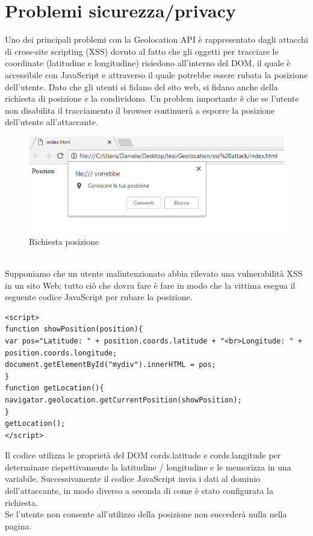 \documentclass[11pt ,a4paper , twoside , openright ]{article}
\begin{document}
\section{Problemi sicurezza/privacy}
Uno dei principali problemi con la Geolocation API è rappresentato dagli attacchi di cross-site scripting (XSS) dovuto al fatto che gli oggetti per tracciare le coordinate (latitudine e longitudine) risiedono all'interno del DOM, il quale è accessibile con JavaScript e attraverso il quale potrebbe essere rubata la posizione dell'utente. 
Dato che gli utenti si fidano del sito web, si fidano anche della richiesta di posizione e la condividono.
Un problem importante è che se l'utente non disabilita il tracciamento il browser continuerà a esporre la posizione dell'utente all'attaccante.
\begin{figure}[h]
	\centering
	\includegraphics[width=1\linewidth]{pos1}
	\caption{Richiesta posizione}
	\label{fig: Richiesta posizione}
\end{figure}
\\
Supponiamo che un utente malintenzionato abbia rilevato una vulnerabilità XSS in un sito Web; tutto ciò che dovra fare è fare in modo che la vittima esegua il seguente codice JavaScript per rubare la posizione.
\begin{lstlisting}
<script>
function showPosition(position){
var pos="Latitude: " + position.coords.latitude + "<br>Longitude: " + position.coords.longitude;
document.getElementById("mydiv").innerHTML = pos;
}
function getLocation(){
navigator.geolocation.getCurrentPosition(showPosition);
}
getLocation();
</script>
\end{lstlisting}
Il codice utilizza le proprietà del DOM cords.latitude e cords.langitude per determinare rispettivamente la latitudine / longitudine e le memorizza in una variabile. Successivamente il codice JavaScript invia i dati al dominio dell'attaccante, in modo diverso a seconda di come è stato configurata la richiesta.	
\\
Se l'utente non consente all'utilizzo della posizione non succederà nulla nella pagina.
\end{document}
